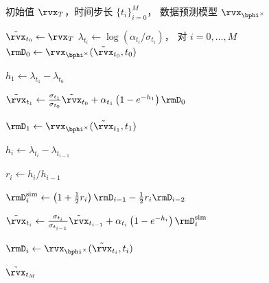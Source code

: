 \begin{algorithm}[H]
    \centering
    \caption{DPM-Solver\texttt{++}(2M).}
    \label{alg:dpmpp-2m}
    \begin{algorithmic}[1]
    \Require 初始值 $\rvx_T$，时间步长 $\{t_i\}_{i=0}^M$，
    数据预测模型 $\rvx_{\bphi^\times}$

    \State $\tilde\rvx_{t_0}\gets\rvx_T$
    \State $\lambda_{t_i}\gets\log(\alpha_{t_i}/\sigma_{t_i})$，
    对 $i=0,\ldots,M$
    \State
    $\rmD_0
    \gets
    \rvx_{\bphi^\times}
    (\tilde\rvx_{t_0},t_0)$

    \Statex
    \noindent{}

    \State
    $h_1
    \gets
    \lambda_{t_1}-\lambda_{t_0}$

    \State
    $\tilde\rvx_{t_1}
    \gets
    \tfrac{\sigma_{t_1}}{\sigma_{t_0}}
    \tilde\rvx_{t_0}
    +
    \alpha_{t_1}
    \left(
    1-e^{-h_1}
    \right)
    \rmD_0$

        \State
        $\rmD_1
        \gets
        \rvx_{\bphi^\times}
        (\tilde\rvx_{t_1},t_1)$
    \EndIf
    \Statex
    \noindent{}

        \State
        $h_i
        \gets
        \lambda_{t_i}-\lambda_{t_{i-1}}$

        \State
        $r_i
        \gets
        h_i/h_{i-1}$

        \State
        $\rmD_i^{\mathrm{sim}}
        \gets
        \left(
        1+\tfrac12 r_i
        \right)
        \rmD_{i-1}
        -
        \tfrac12 r_i
        \rmD_{i-2}$

        \State
        $\tilde\rvx_{t_i}
        \gets
        \tfrac{\sigma_{t_i}}{\sigma_{t_{i-1}}}
        \tilde\rvx_{t_{i-1}}
        +
        \alpha_{t_i}
        \left(
        1-e^{-h_i}
        \right)
        \rmD_i^{\mathrm{sim}}$

            \State
            $\rmD_i
            \gets
            \rvx_{\bphi^\times}
            (\tilde\rvx_{t_i},t_i)$
        \EndIf
    \EndFor

    \State \Return $\tilde\rvx_{t_M}$
    \end{algorithmic}
\end{algorithm}


